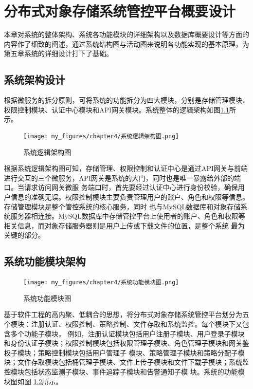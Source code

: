 \chapter{分布式对象存储系统管控平台概要设计}


本章对系统的整体架构、系统各功能模块的详细架构以及数据库概要设计等方面的内容作了细致的阐述，通过系统结构图与活动图来说明各功能实现的基本原理，为第五章系统的详细设计打下了基础。


\section{系统架构设计}

根据微服务的拆分原则，可将系统的功能拆分为四大模块，分别是存储管理模块、权限控制模块、认证中心模块和API网关模块。系统整体的逻辑架构如图\ref{fig:系统逻辑架构图}所示。
\begin{figure}[h]
    \centering
    \texttt{[image: my\_figures/chapter4/系统逻辑架构图.png]}
    \caption{系统逻辑架构图}
    \label{fig:系统逻辑架构图}
\end{figure}

根据系统逻辑架构图可知，存储管理、权限控制和认证中心是通过API网关与前端进行交互的三个微服务，API网关是系统的大门，同时也是唯一暴露给外部的端口。当请求访问网关微服
务端口时，首先要经过认证中心进行身份校验，确保用户信息的准确无误。权限控制模块主要负责管理用户的账户、角色和权限等信息。存储管理模块是整个管控系统的核心服务，同时
也与MySQL数据库和对象存储系统服务器相连接。MySQL数据库中存储管控平台上使用者的账户、角色和权限等相关信息，而对象存储服务器则是用户上传或下载文件的位置，是整个系统
最为关键的部分。

\section{系统功能模块架构}

\begin{figure}[h]
    \centering
    \texttt{[image: my\_figures/chapter4/系统功能模块图.png]}
    \caption{系统功能模块图}
    \label{fig:系统功能模块图}
\end{figure}

基于软件工程的高内聚、低耦合的思想，将分布式对象存储系统管控平台划分为五个模块：注册认证、权限控制、策略控制、文件存取和系统监控。每个模块下又包含多个功能子模块，
例如，注册认证模块包括用户注册子模块、用户登录子模块和身份认证子模块；权限控制模块包括权限管理子模块、角色管理子模块和网关鉴权子模块；策略控制模块包括用户管理子
模块、策略管理子模块和策略分配子模块；文件存取模块包括桶管理子模块、文件上传子模块和文件下载子模块；系统监控模块包括状态监测子模块、事件追踪子模块和告警通知子模
块。系统的功能模块图如图 \ref{fig:系统功能模块图}所示。

